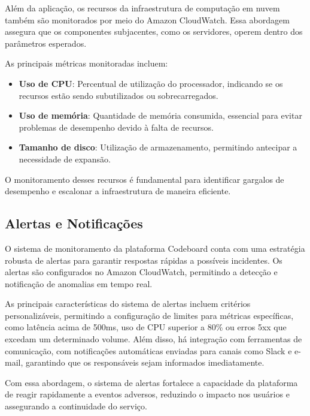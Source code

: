 Além da aplicação, os recursos da infraestrutura de computação em nuvem também são monitorados por meio do Amazon CloudWatch. Essa abordagem assegura que os componentes subjacentes, como os servidores, operem dentro dos parâmetros esperados.

As principais métricas monitoradas incluem:

\begin{itemize}
    \item \textbf{Uso de CPU}: Percentual de utilização do processador, indicando se os recursos estão sendo subutilizados ou sobrecarregados.
    \item \textbf{Uso de memória}: Quantidade de memória consumida, essencial para evitar problemas de desempenho devido à falta de recursos.
    \item \textbf{Tamanho de disco}: Utilização de armazenamento, permitindo antecipar a necessidade de expansão.
\end{itemize}

O monitoramento desses recursos é fundamental para identificar gargalos de desempenho e escalonar a infraestrutura de maneira eficiente.

\subsection{Alertas e Notificações}

O sistema de monitoramento da plataforma Codeboard conta com uma estratégia robusta de alertas para garantir respostas rápidas a possíveis incidentes. Os alertas são configurados no Amazon CloudWatch, permitindo a detecção e notificação de anomalias em tempo real.

As principais características do sistema de alertas incluem critérios personalizáveis, permitindo a configuração de limites para métricas específicas, como latência acima de 500ms, uso de CPU superior a 80\% ou erros 5xx que excedam um determinado volume. Além disso, há integração com ferramentas de comunicação, com notificações automáticas enviadas para canais como Slack e e-mail, garantindo que os responsáveis sejam informados imediatamente.

Com essa abordagem, o sistema de alertas fortalece a capacidade da plataforma de reagir rapidamente a eventos adversos, reduzindo o impacto nos usuários e assegurando a continuidade do serviço.
